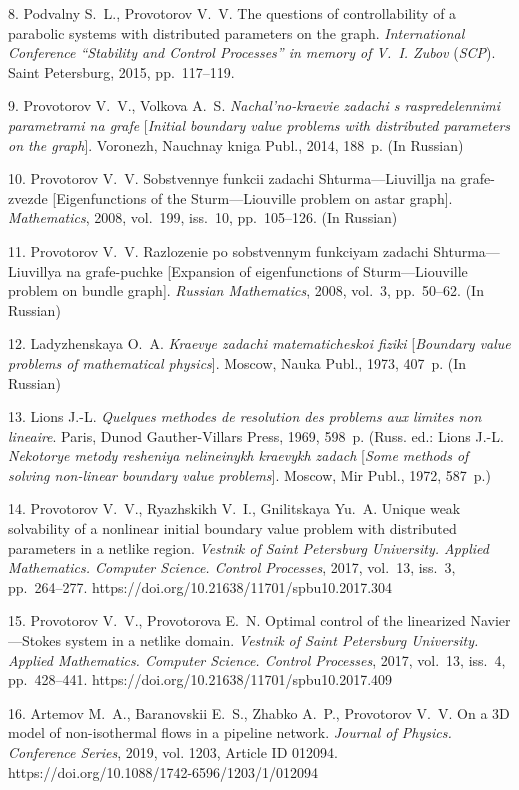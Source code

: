 {8. Podvalny S.~L., Provotorov V.~V. The questions of
controllability of a parabolic systems with distributed parameters
on the graph. \emph{International Conference ``Stability and
Control Processes'' in memory of V.~I. Zubov} (\emph{SCP}). Saint
Petersburg, 2015, pp.~117--119.

9. Provotorov V.~V., Volkova A.~S.  \textit{Nachal'no-kraevie
zadachi s raspredelennimi parametrami na grafe} [\textit{Initial
boundary value problems with distributed parameters on the
graph}]. Voronezh, Nauchnay kniga Publ.,  2014,  188~p. (In
Russian)

10. Provotorov V.~V.  Sobstvennye funkcii zadachi
Shturma---Liuvillja na grafe-zvezde [Eigenfunctions of the
Sturm---Liouville problem on astar graph]. \emph{Mathematics},
2008, vol.~199, iss.~10, pp.~105--126.    (In Russian)

11. Provotorov V.~V. Razlozenie po sobstvennym funkciyam zadachi
Shturma---Liuvillya na grafe-puchke [Expansion  of eigenfunctions
of Sturm---Liouville problem on bundle graph]. \emph{Russian
Mathematics}, 2008, vol.~3, pp.~50--62. (In Russian)

12. Ladyzhenskaya O.~A. \textit{Kraevye zadachi matematicheskoi
fiziki} [\textit{Boundary value problems of mathematical
physics}]. Moscow, Nauka Publ., 1973, 407~p. (In Russian)

13. Lions J.-L. \textit{Quelques methodes de resolution des
problems aux limites non lineaire}. Paris, Dunod Gauther-Villars
Press, 1969, 598~p. (Russ. ed.: Lions J.-L. \textit{Nekotorye
metody resheniya nelineinykh kraevykh zadach} [\textit{Some
methods of solving non-linear boundary value problems}]. Moscow,
Mir Publ., 1972, 587~p.)

14. Provotorov V.~V.,  Ryazhskikh V.~I., Gnilitskaya Yu.~A. Unique
weak solvability of a nonlinear initial boundary value problem
with distributed parameters in a netlike region. \textit{Vestnik
of Saint Petersburg University. Applied Mathematics. Computer
Science. Control Processes}, 2017, vol.~13, iss.~3, pp.~264--277.
https://doi.org/10.21638/11701/spbu10.2017.304

15. Provotorov V.~V., Provotorova E.~N.  Optimal control of the
linearized Navier---Stokes system in a netlike domain.
\textit{Vestnik of Saint Petersburg University. Applied
Mathematics. Computer Science. Control Processes}, 2017, vol.~13,
iss.~4, pp.~428--441.
https://doi.org/10.21638/11701/spbu10.2017.409

16. Artemov M.~A.,  Baranovskii E.~S.,  Zhabko A.~P.,  Provotorov
V.~V. On a 3D model of non-isothermal flows in a pipeline network.
\emph{Journal of Physics. Conference Series}, 2019, vol. 1203,
Article ID 012094. https://doi.org/10.1088/1742-6596/1203/1/012094

}
